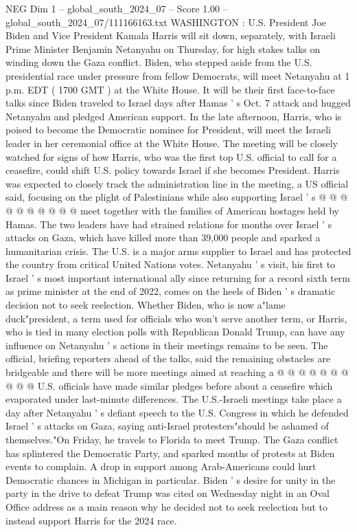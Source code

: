 \begin{textsample}{NEG Dim 1 – global\_south\_2024\_07 – Score 1.00 – global\_south\_2024\_07/111166163.txt}  \label{ex:f1_neg_395}
WASHINGTON : U.S.
President Joe Biden and Vice President Kamala Harris will sit down, separately, with Israeli Prime Minister Benjamin Netanyahu on Thursday, for high stakes talks on winding down the Gaza conflict.
Biden, who stepped aside from the U.S. presidential race under pressure from fellow Democrats, will meet Netanyahu at 1 p.m.
EDT ( 1700 GMT ) at the White House.
It will be their first face-to-face talks since Biden traveled to Israel days after Hamas ' s Oct. 7 attack and hugged Netanyahu and pledged American support.
In the late afternoon, Harris, who is poised to become the Democratic nominee for President, will meet the Israeli leader in her ceremonial office at the White House.
The meeting will be closely watched for signs of how Harris, who was the first top U.S. official to call for a ceasefire, could shift U.S. policy towards Israel if she becomes President.
Harris was expected to closely track the administration line in the meeting, a US official said, focusing on the plight of Palestinians while also supporting Israel ' s @ @ @ @ @ @ @ @ @ @ meet together with the families of American hostages held by Hamas.
The two leaders have had strained relations for months over Israel ' s attacks on Gaza, which have killed more than 39,000 people and sparked a humanitarian crisis.
The U.S. is a major arms supplier to Israel and has protected the country from critical United Nations votes.
Netanyahu ' s visit, his first to Israel ' s most important international ally since returning for a record sixth term as prime minister at the end of 2022, comes on the heels of Biden ' s dramatic decision not to seek reelection.
Whether Biden, who is now a"lame duck"president, a term used for officials who won't serve another term, or Harris, who is tied in many election polls with Republican Donald Trump, can have any influence on Netanyahu ' s actions in their meetings remains to be seen.
The official, briefing reporters ahead of the talks, said the remaining obstacles are bridgeable and there will be more meetings aimed at reaching a @ @ @ @ @ @ @ @ @ @ U.S. officials have made similar pledges before about a ceasefire which evaporated under last-minute differences.
The U.S.-Israeli meetings take place a day after Netanyahu ' s defiant speech to the U.S.
Congress in which he defended Israel ' s attacks on Gaza, saying anti-Israel protesters"should be ashamed of themselves."On Friday, he travels to Florida to meet Trump.
The Gaza conflict has splintered the Democratic Party, and sparked months of protests at Biden events to complain.
A drop in support among Arab-Americans could hurt Democratic chances in Michigan in particular.
Biden ' s desire for unity in the party in the drive to defeat Trump was cited on Wednesday night in an Oval Office address as a main reason why he decided not to seek reelection but to instead support Harris for the 2024 race.

\end{textsample}
